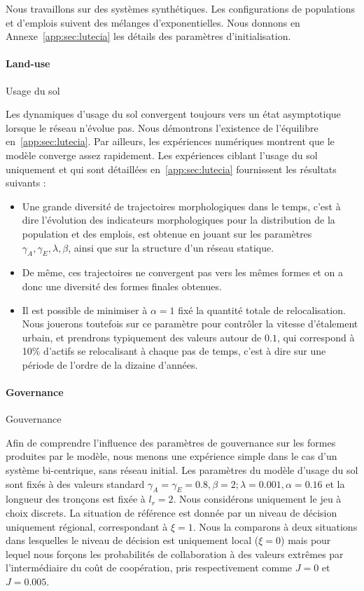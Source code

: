 Nous travaillons sur des systèmes synthétiques. Les configurations de populations et d'emplois suivent des mélanges d'exponentielles. Nous donnons en Annexe~\ref{app:sec:lutecia} les détails des paramètres d'initialisation.


\paragraph{Land-use}{Usage du sol}

Les dynamiques d'usage du sol convergent toujours vers un état asymptotique lorsque le réseau n'évolue pas. Nous démontrons l'existence de l'équilibre en~\ref{app:sec:lutecia}. Par ailleurs, les expériences numériques montrent que le modèle converge assez rapidement. Les expériences ciblant l'usage du sol uniquement et qui sont détaillées en~\ref{app:sec:lutecia} fournissent les résultats suivants :
\begin{itemize}
	\item Une grande diversité de trajectoires morphologiques dans le temps, c'est à dire l'évolution des indicateurs morphologiques pour la distribution de la population et des emplois, est obtenue en jouant sur les paramètres $\gamma_A, \gamma_E, \lambda, \beta$, ainsi que sur la structure d'un réseau statique.
	\item De même, ces trajectoires ne convergent pas vers les mêmes formes et on a donc une diversité des formes finales obtenues.
	\item Il est possible de minimiser à $\alpha = 1$ fixé la quantité totale de relocalisation. Nous jouerons toutefois sur ce paramètre pour contrôler la vitesse d'étalement urbain, et prendrons typiquement des valeurs autour de $0.1$, qui correspond à 10\% d'actifs se relocalisant à chaque pas de temps, c'est à dire sur une période de l'ordre de la dizaine d'années.
\end{itemize}



\paragraph{Governance}{Gouvernance}

Afin de comprendre l'influence des paramètres de gouvernance sur les formes produites par le modèle, nous menons une expérience simple dans le cas d'un système bi-centrique, sans réseau initial. Les paramètres du modèle d'usage du sol sont fixés à des valeurs standard $\gamma_A = \gamma_E = 0.8, \beta = 2 ; \lambda = 0.001, \alpha = 0.16$ et la longueur des tronçons est fixée à $l_r = 2$. Nous considérons uniquement le jeu à choix discrets. La situation de référence est donnée par un niveau de décision uniquement régional, correspondant à $\xi = 1$. Nous la comparons à deux situations dans lesquelles le niveau de décision est uniquement local ($\xi = 0$) mais pour lequel nous forçons les probabilités de collaboration à des valeurs extrêmes par l'intermédiaire du coût de coopération, pris respectivement comme $J=0$ et $J=0.005$.


